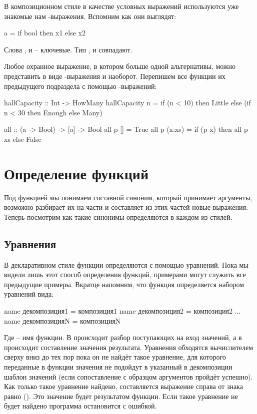 В композиционном стиле в качестве условных выражений
используются уже знакомые нам -выражения. Вспомним
как они выглядят:

\begin{code}
a = if bool 
    then x1
    else x2
\end{code}

Слова ,  и  -- ключевые. Тип , 
 и  совпадают.

Любое охранное выражение, в котором больше одной альтернативы,
можно представить в виде -выражения и наоборот. 
Перепишем все функции их предыдущего подраздела с помощью
-выражений:

\begin{code}
hallCapacity :: Int -> HowMany
hallCapacity n =
    if (n < 10)
    then Little
    else (if n < 30 
          then Enough
          else Many)

all :: (a -> Bool) -> [a] -> Bool
all p []     = True
all p (x:xs) = if (p x) then all p xs else False
\end{code}

\section{Определение функций}

Под функцией мы понимаем составной синоним, который
принимает аргументы, возможно разбирает их на части и
составляет из этих частей новые выражения. Теперь посмотрим
как такие синонимы определяются в каждом из стилей.

\subsection{Уравнения}

В декларативном стиле функции определяются с помощью
уравнений. Пока мы видели лишь этот способ определения функций,
примерами могут служить все предыдущие примеры. Вкратце напомним,
что функция определяется набором уравнений вида:

\begin{code}
name декомпозиция1 = композиция1
name декомпозиция2 = композиция2
...
name декомпозицияN = композицияN
\end{code}

Где  -- имя функции. В  происходит 
разбор поступающих на вход значений, а в  происходит
составление значения результата. Уравнения обходятся вычислителем
сверху вниз до тех пор пока он не найдёт такое уравнение, для
которого переданные в функции значения не подойдут в указанный
в декомпозиции шаблон значений (если сопоставление с образцом
аргументов пройдёт успешно). Как только такое уравнение найдено,
составляется выражение справа от знака равно ().
Это значение будет результатом функции. Если такое уравнение
не будет найдено программа остановится с ошибкой.

